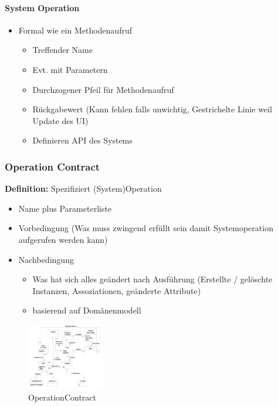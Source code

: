 \documentclass{article}
\begin{document}
\paragraph{System Operation}
\begin{itemize}
	\item Formal wie ein Methodenaufruf
	\begin{itemize}
		\item Treffender Name
		\item Evt. mit Parametern
		\item Durchzogener Pfeil für Methodenaufruf
		\item Rückgabewert (Kann fehlen falls unwichtig, Gestrichelte Linie weil Update des UI)
		\item Definieren API des Systems
	\end{itemize}

\end{itemize}

\subsubsection{Operation Contract}

\textbf{Definition: } Spezifiziert (System)Operation \\

\begin{itemize}
	\item Name plus Parameterliste
	\item Vorbedingung (Was muss zwingend erfüllt sein damit Systemoperation aufgerufen werden kann)
	\item Nachbedingung
	\begin{itemize}
		\item Was hat sich alles geändert nach Ausführung (Erstellte / gelöschte Instanzen, Assoziationen, geänderte Attribute)
		\item basierend auf Domänenmodell
	\end{itemize}
\end{itemize}

\begin{figure}[H]
	\centering
	\includegraphics[width=0.3\textwidth] {Resources/Images/OperationContract.png}
	\caption{\label{fig:OperationContract}OperationContract}
	\end{figure}
\end{document}
